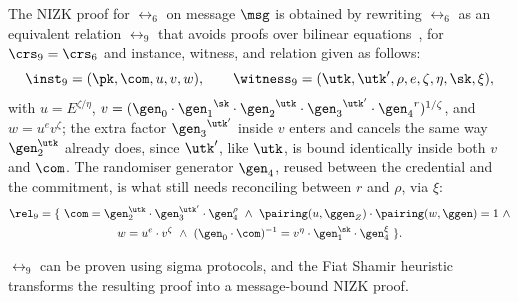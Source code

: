 The NIZK proof for $\rel_6$ on message $\msg$ is obtained by rewriting $\rel_6$
as an equivalent relation $\rel_9$ that avoids proofs over bilinear
equations~\cite{EPRINT:CamDriLeh16,USENIX:HesSinSor23}, for $\crs_9 = \crs_6$
and instance, witness, and relation given as follows:
%
\begin{equation}
%
  \inst_9 = (\pk, \com, u, v, w), \qquad \witness_9 = (\utk, \utk', \rho, e,
  \zeta, \eta, \sk, \xi),
%
\end{equation}
%
with $u = E^{\zeta/\eta}$, $v =
({\gen_0}\cdot{\gen_1}^{\sk}\cdot{\gen_2}^{\utk}\cdot{\gen_3}^{\utk'}\cdot
{\gen_4}^r)^{1/\zeta}$, and $w = u^e v^{\zeta}$; the extra factor
${\gen_3}^{\utk'}$ inside $v$ enters and cancels the same way $\gen_2^{\utk}$
already does, since $\utk'$, like $\utk$, is bound identically inside both $v$
and $\com$. The randomiser generator $\gen_4$, reused between the credential
and the commitment, is what still needs reconciling between $r$ and $\rho$, via
$\xi$:
%
\begin{equation}\label{eq:rel6-hat} \begin{gathered}
%
  \rel_9 = \{\ \com = \gen_2^{\utk}\cdot\gen_3^{\utk'}\cdot\gen_4^{\rho}\
  \wedge \ \pairing(u, \ggen_Z)\cdot \pairing(w, \ggen) = 1 \ \wedge \\ w =
u^e\cdot v^{\zeta} \ \wedge \ (\gen_0\cdot\com)^{-1} = v^{\eta}\cdot
\gen_1^{\sk}\cdot\gen_4^{\xi}\ \}.
%
\end{gathered} \end{equation}
%

$\rel_9$ can be proven using sigma protocols, and the Fiat Shamir heuristic
transforms the resulting proof into a message-bound NIZK proof.

